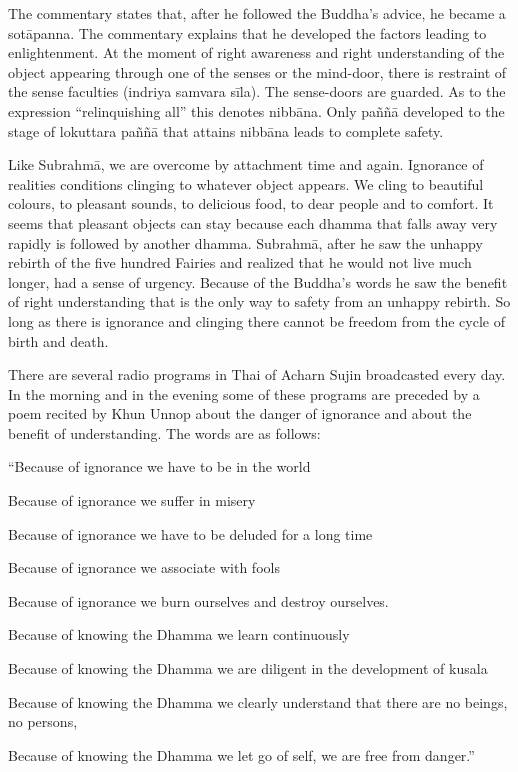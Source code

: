 {{{{{{{The commentary states that, after he
followed the Buddha's advice, he became a sotāpanna. The commentary
explains that he developed the factors leading to enlightenment. At the
moment of right awareness and right understanding of the object
appearing through one of the senses or the mind-door, there is restraint
of the sense faculties (indriya samvara sīla). The sense-doors are
guarded. As to the expression ``relinquishing all'' this denotes
nibbāna. Only paññā developed to the stage of lokuttara paññā that
attains nibbāna leads to complete safety. 

Like Subrahmā, we are overcome by
attachment time and again. Ignorance of realities conditions clinging to
whatever object appears. We cling to beautiful colours, to pleasant
sounds, to delicious food, to dear people and to comfort. It seems that
pleasant objects can stay because each dhamma that falls away very
rapidly is followed by another dhamma. Subrahmā, after he saw the
unhappy rebirth of the five hundred Fairies and realized that he would
not live much longer, had a sense of urgency. Because of the Buddha's
words he saw the benefit of right understanding that is the only way to
safety from an unhappy rebirth. So long as there is ignorance and
clinging there cannot be freedom from the cycle of birth and death. 

There are several radio programs in
Thai of Acharn Sujin broadcasted every day. In the morning and in the
evening some of these programs are preceded by a poem recited by Khun
Unnop about the danger of ignorance and about the benefit of
understanding. The words are as follows:

``Because of ignorance we have to be in the world

Because of ignorance we suffer in misery

Because of ignorance we have to be deluded for a long time

Because of ignorance we associate with fools

Because of ignorance we burn ourselves and destroy ourselves.

Because of knowing the Dhamma we learn continuously

Because of knowing the Dhamma we are diligent in the development of
kusala

Because of knowing the Dhamma we clearly understand that there are no
beings, no persons,

Because of knowing the Dhamma we let go of self, we are free from
danger.''

}}}}}}}
